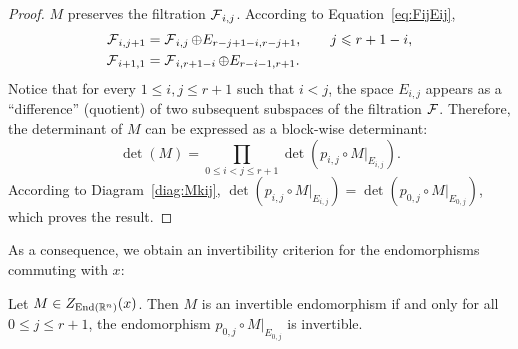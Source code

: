 \documentclass[english]{article}
\begin{document}
\begin{proof}
    $M$ preserves the filtration $\operatorname{\mathcal{F}}_{i,j}$.
    According to Equation~\eqref{eq:FijEij}, 
    \begin{align}\label{eqn: flag_complements}
        \operatorname{\mathcal{F}}_{i, j+1}
            &= 
        \operatorname{\mathcal{F}}_{i,j} \oplus E_{r-j+1-i,r-j+1},
        \qquad j\leqslant r+1-i,
        \\
        \operatorname{\mathcal{F}}_{i+1, 1}
            &= \operatorname{\mathcal{F}}_{i, r+1-i} \oplus E_{r-i-1, r+1}
        .
    \end{align} 
    Notice that for every $1 \leqslant i, j \leqslant r+1$ such that $i<j$, the space $E_{i,j}$ appears as a \enquote{difference} (quotient) of two subsequent subspaces of the filtration $\operatorname{\mathcal{F}}$.
    Therefore, the determinant of $M$ can be expressed as a block-wise determinant:
    \[
        \det(M) = \prod_{0 \leqslant  i<j \leqslant r+1} \det(p_{i,j}\circ M|_{E_{i,j}}).
    \]
%
    According to Diagram~\eqref{diag:Mkij}, $\det(p_{i,j}\circ M|_{E_{i,j}}) = \det(p_{0,j}\circ M|_{E_{0,j}})$, which proves the result.
\end{proof}
%
As a consequence, we obtain an invertibility criterion for the endomorphisms commuting with $x$:
\begin{corollary}
    Let $M\in Z_{\operatorname{End}(\mathbb{R}^n)} (x)$.
    Then $M$ is an invertible endomorphism if and only for all $0 \leqslant j \leqslant r+1$, the endomorphism $p_{0,j}\circ M|_{E_{0,j}}$ is invertible.
\end{corollary}


\printbibliography
\end{document}
